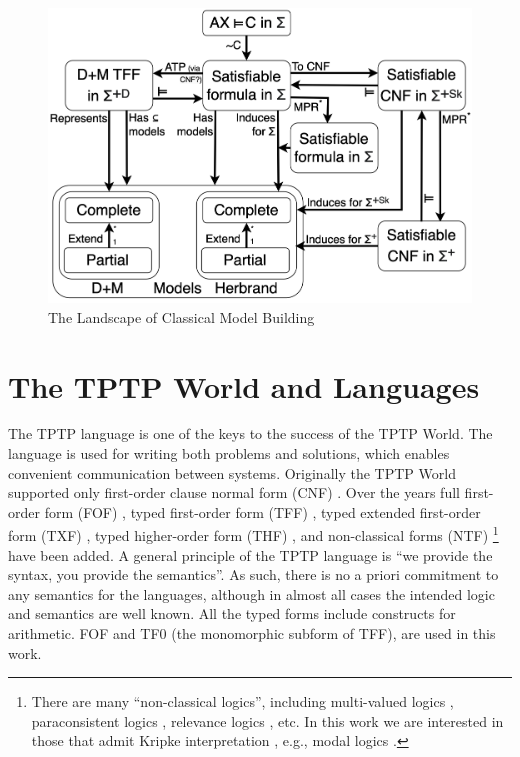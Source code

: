 \documentclass{easychair}
\begin{document}
\begin{figure}[htbp]
\includegraphics[width=\textwidth]{ModelLandscape.pdf}
\caption{The Landscape of Classical Model Building}
\label{ModelLandscape}
\end{figure}

\section{The TPTP World and Languages}
\label{TPTP}

The TPTP language \cite{Sut23-IGPL} is one of the keys to the success of the TPTP World.
The language is used for writing both problems and solutions,
which enables convenient communication between systems. 
Originally the TPTP World supported only first-order clause normal form (CNF)
\cite{SS98-JAR}.
Over the years full first-order form (FOF)
\cite{Sut09}, 
typed first-order form (TFF)
\cite{SS+12,BP13-TFF1}, 
typed extended first-order form (TXF)
\cite{SK18}, 
typed higher-order form (THF)
\cite{SB10,KSR16}, 
and non-classical forms (NTF)
\footnote{%
There are many ``non-classical logics'', including multi-valued logics \cite{Aug17},
paraconsistent logics \cite{Pri02}, relevance logics \cite{AB75}, etc.
In this work we are interested in those that admit Kripke interpretation \cite{Kri63},
e.g., modal logics \cite{BBW06}.}
\cite{SF+22} 
have been added.
A general principle of the TPTP language is ``we provide the syntax, you provide the semantics''.
As such, there is no a priori commitment to any semantics for the languages, although in almost 
all cases the intended logic and semantics are well known.
All the typed forms include constructs for arithmetic.
FOF and TF0 \cite{SS+12} (the monomorphic subform of TFF), are used in this work.
\end{document}
